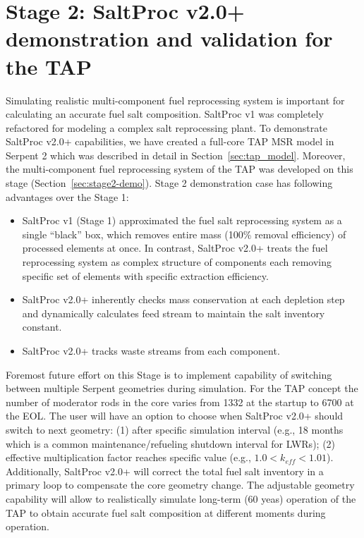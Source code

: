 \section{Stage 2: SaltProc v2.0+ demonstration and validation for the TAP}
Simulating realistic multi-component fuel reprocessing system is important for 
calculating an accurate fuel salt composition. SaltProc v1 was completely 
refactored for modeling a complex salt reprocessing plant. To demonstrate 
SaltProc v2.0+ capabilities, we have created a full-core \gls{TAP} 
\gls{MSR} model in Serpent 2 \cite{chaube_tap_2019} which was described in 
detail in Section~\ref{sec:tap_model}. Moreover, the multi-component fuel 
reprocessing system of the \gls{TAP} was developed on this stage 
(Section~\ref{sec:stage2-demo}). Stage 2 demonstration case has following 
advantages over the Stage 1:
\begin{itemize}
	\item SaltProc v1 (Stage 1) approximated the fuel salt reprocessing system 
	as a single ``black'' box, which removes entire mass (100\% removal 
	efficiency) of processed elements at once. In contrast, SaltProc v2.0+ 
	treats the fuel reprocessing system as complex structure of components 
	each removing specific set of elements with specific extraction 
	efficiency. 
	\item SaltProc v2.0+ inherently checks mass conservation at each depletion 
	step and dynamically calculates feed stream to maintain the salt inventory 
	constant.
	\item SaltProc v2.0+ tracks waste streams from each component.
\end{itemize}

Foremost future effort on this Stage is to implement capability of switching 
between multiple Serpent geometries during simulation. For the \gls{TAP} 
concept the number of moderator rods in the core varies from 1332 at the 
startup to 6700 at the \gls{EOL}. The user will have an option to choose when 
SaltProc v2.0+ should switch to next geometry: (1) after specific simulation 
interval (e.g., 18 months which is a common maintenance/refueling shutdown 
interval for \glspl{LWR}); (2) effective multiplication factor reaches 
specific value (e.g., $1.0<k_{eff} < 1.01$). Additionally, SaltProc v2.0+ will 
correct the total fuel salt inventory in a primary loop to compensate the core 
geometry change. The adjustable geometry capability will allow to 
realistically simulate long-term (60 yeas) operation of the \gls{TAP} to 
obtain accurate fuel salt composition at different moments during operation.


